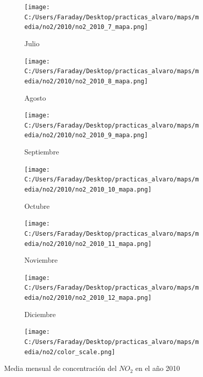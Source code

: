 \documentclass[12pt]{article}
\begin{document}
\begin{figure}[H]
\begin{subfigure}[H]{0.15\textwidth}
\texttt{[image: C:/Users/Faraday/Desktop/practicas\_alvaro/maps/media/no2/2010/no2\_2010\_7\_mapa.png]}
\captionsetup{labelformat=empty}
\caption{Julio}
\label{fig:map-no2-2010-7}
\end{subfigure}
%
\begin{subfigure}[H]{0.15\textwidth}
\texttt{[image: C:/Users/Faraday/Desktop/practicas\_alvaro/maps/media/no2/2010/no2\_2010\_8\_mapa.png]}
\captionsetup{labelformat=empty}
\caption{Agosto}
\label{fig:map-no2-2010-8}
\end{subfigure}
%
\begin{subfigure}[H]{0.15\textwidth}
\texttt{[image: C:/Users/Faraday/Desktop/practicas\_alvaro/maps/media/no2/2010/no2\_2010\_9\_mapa.png]}
\captionsetup{labelformat=empty}
\caption{Septiembre}
\label{fig:map-no2-2010-9}
\end{subfigure}
%
\begin{subfigure}[H]{0.15\textwidth}
\texttt{[image: C:/Users/Faraday/Desktop/practicas\_alvaro/maps/media/no2/2010/no2\_2010\_10\_mapa.png]}
\captionsetup{labelformat=empty}
\caption{Octubre}
\label{fig:map-no2-2010-10}
\end{subfigure}
%
\begin{subfigure}[H]{0.15\textwidth}
\texttt{[image: C:/Users/Faraday/Desktop/practicas\_alvaro/maps/media/no2/2010/no2\_2010\_11\_mapa.png]}
\captionsetup{labelformat=empty}
\caption{Noviembre}
\label{fig:map-no2-2010-11}
\end{subfigure}
%
\begin{subfigure}[H]{0.15\textwidth}
\texttt{[image: C:/Users/Faraday/Desktop/practicas\_alvaro/maps/media/no2/2010/no2\_2010\_12\_mapa.png]}
\captionsetup{labelformat=empty}
\caption{Diciembre}
\label{fig:map-no2-2010-12}
\end{subfigure}

\begin{subfigure}[H]{0.45\textwidth}
\texttt{[image: C:/Users/Faraday/Desktop/practicas\_alvaro/maps/media/no2/color\_scale.png]}
\captionsetup{labelformat=empty}
\caption{}
\end{subfigure}

\vspace*{-7mm}
\caption{Media mensual de concentración del $NO_{2}$ en el año 2010}
\label{fig:map-no2-2010}
\end{figure}
\end{document}
